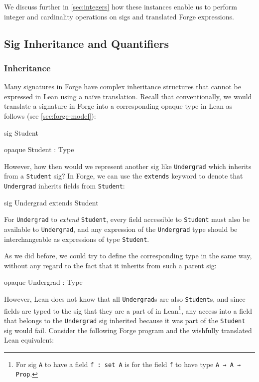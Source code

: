We discuss further in \cref{sec:integers} how these instances enable us to perform integer and cardinality operations on sigs and translated Forge expressions. 


\subsection{Sig Inheritance and Quantifiers}\label{sec:sigs}
\subsubsection{Inheritance}
Many signatures in Forge have complex inheritance structures \cite{jackson2012software} that cannot be expressed in Lean using a na\"ive translation. Recall that conventionally, we would translate a signature in Forge into a corresponding opaque type in Lean as follows (see \cref{sec:forge-model}):

\vspace{0.5em}
\noindent\begin{minipage}{0.5\textwidth}
\begin{forge*}sig Student {}\end{forge*}
\end{minipage}%
\begin{minipage}{0.5\textwidth}
\begin{lean*}opaque Student : Type\end{lean*}
\end{minipage}
\vspace{0.5em}

However, how then would we represent another sig like \texttt{Undergrad} which inherits from a \texttt{Student} sig? In Forge, we can use the \texttt{extends} keyword to denote that \texttt{Undergrad} inherits fields from \texttt{Student}: 
\begin{forge*}
sig Undergrad extends Student {}
\end{forge*}

For \texttt{Undergrad} to \emph{extend} \texttt{Student}, every field accessible to \texttt{Student} must also be available to \texttt{Undergrad}, and any expression of the \texttt{Undergrad} type should be interchangeable as expressions of type \texttt{Student}. 

As we did before, we could try to define the corresponding type in the same way, without any regard to the fact that it inherits from such a parent sig: 
\begin{lean*}
opaque Undergrad : Type
\end{lean*}
However, Lean does not know that all \texttt{Undergrad}s are also \texttt{Student}s, and since fields are typed to the sig that they are a part of in Lean\footnote{For sig \texttt{A} to have a field \texttt{f : set A} is for the field \texttt{f} to have type \texttt{A → A → Prop}.}, any access into a field that belongs to the \texttt{Undergrad} sig inherited because it was part of the \texttt{Student} sig would fail. Consider the following Forge program and the wishfully translated Lean equivalent:

